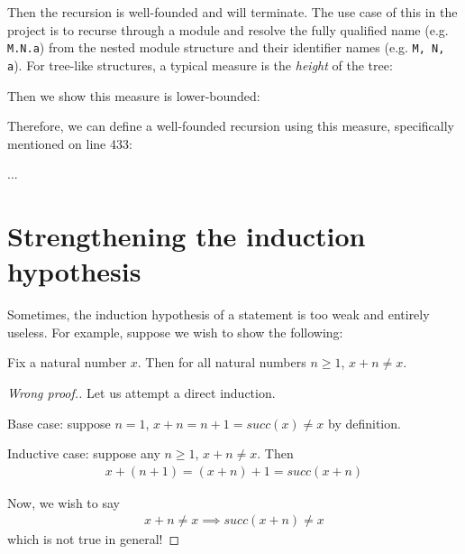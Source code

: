 Then the recursion is well-founded and will terminate. The use case of this in
the project is to recurse through a module and resolve the fully qualified name
(e.g. \verb|M.N.a|) from the nested module structure and their identifier names
(e.g. \verb|M, N, a|). For tree-like structures, a typical measure is the
\emph{height} of the tree:

\begin{listing}[H]
  \caption{Height defined on structure body.}
  \label{lst:def-sb-height}
\end{listing}

Then we show this measure is lower-bounded:

\begin{listing}[H]
  \caption{Proof of lower bound of the height measure.}
  \label{lst:def-height-lb}
\end{listing}

Therefore, we can define a well-founded recursion using this measure,
specifically mentioned on line 433: 

\begin{listing}[H]
...
  \caption{Defining a well-founded recursive function using the new measure.}
  \label{lst:def-wf}
\end{listing}


\section{Strengthening the induction hypothesis}
\label{sec:str-ih}

Sometimes, the induction hypothesis of a statement is too weak and entirely
useless. For example, suppose we wish to show the following:

\begin{theorem}
  Fix a natural number $x$. Then for all natural numbers $n\ge1$, $x+n\ne x$.
\end{theorem}
\begin{proof}[Wrong proof.]
Let us attempt a direct induction.

Base case: suppose $n=1$, $x+n=n+1=succ(x)\ne x$ by definition.

Inductive case: suppose any $n\ge 1$, $x+n\ne x$. Then
\begin{align*}
  x + (n+1) = (x + n) + 1 = succ(x + n)
\end{align*}

Now, we wish to say
\begin{align*}
  x + n \ne x \implies succ(x + n) \ne x
\end{align*}
which is not true in general!
\end{proof}

